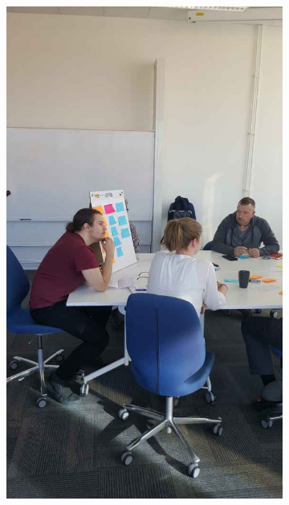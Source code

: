 \begin{figure}[hb]
    \begin{subfigure}{.32\textwidth}
        \centering
        \includegraphics[width=\textwidth, angle=270, origin=c]{img/workshop2_resized.jpg}
        \label{fig:workshop2}
    \end{subfigure}
    \begin{subfigure}{.32\textwidth}
        \centering

\end{subfigure}
\end{figure}
